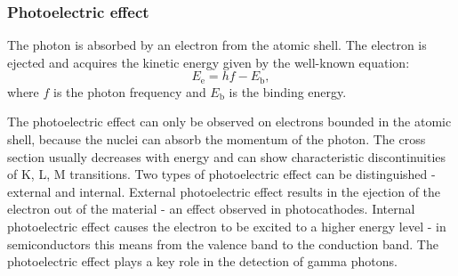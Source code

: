 \subsubsection{Photoelectric effect}
The photon is absorbed by an electron from the atomic shell. The electron is ejected and acquires the kinetic energy given by the well-known equation:
 \begin{equation}
 E_{\textrm{e}} = hf - E_{\textrm{b}},
 \end{equation}
where $f$ is the photon frequency and $E_{\textrm{b}}$ is the binding energy.
\par
The photoelectric effect can only be observed on electrons bounded in the atomic shell, because the nuclei can absorb the momentum of the photon. The cross section usually decreases with energy and can show characteristic discontinuities of K, L, M transitions. Two types of photoelectric effect can be distinguished - external and internal. External photoelectric effect results in the ejection of the electron out of the material - an effect observed in photocathodes. Internal photoelectric effect causes the electron to be excited to a higher energy level - in semiconductors this means from the valence band to the conduction band. The photoelectric effect plays a key role in the detection of gamma photons.

